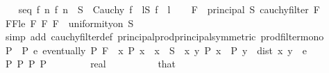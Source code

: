 \begin{isabellebody}
\ \ \isamarkupfalse%
\ seq{\isacharcolon}{\kern0pt}\ {\isachardoublequoteopen}{\isasymforall}f{\isachardot}{\kern0pt}\ {\isacharparenleft}{\kern0pt}{\isasymforall}n{\isachardot}{\kern0pt}\ f\ n\ {\isasymin}\ S{\isacharparenright}{\kern0pt}\ {\isasymand}\ Cauchy\ f\ {\isasymlongrightarrow}\ {\isacharparenleft}{\kern0pt}{\isasymexists}l{\isasymin}S{\isachardot}{\kern0pt}\ f\ {\isasymlonglonglongrightarrow}\ l{\isacharparenright}{\kern0pt}{\isachardoublequoteclose}\isanewline
\isanewline
\ \ \isamarkupfalse%
\ {\isacartoucheopen}F\ {\isasymle}\ principal\ S{\isacartoucheclose}\ {\isacartoucheopen}cauchy{\isacharunderscore}{\kern0pt}filter\ F{\isacartoucheclose}\isanewline
\ \ \isamarkupfalse%
\ FF{\isacharunderscore}{\kern0pt}le{\isacharcolon}{\kern0pt}\ {\isachardoublequoteopen}F\ {\isasymtimes}\isactrlsub F\ F\ {\isasymle}\ uniformity{\isacharunderscore}{\kern0pt}on\ S{\isachardoublequoteclose}\isanewline
\ \ \ \ \isamarkupfalse%
\ {\isacharparenleft}{\kern0pt}simp\ add{\isacharcolon}{\kern0pt}\ cauchy{\isacharunderscore}{\kern0pt}filter{\isacharunderscore}{\kern0pt}def\ principal{\isacharunderscore}{\kern0pt}prod{\isacharunderscore}{\kern0pt}principal{\isacharbrackleft}{\kern0pt}symmetric{\isacharbrackright}{\kern0pt}\ prod{\isacharunderscore}{\kern0pt}filter{\isacharunderscore}{\kern0pt}mono{\isacharparenright}{\kern0pt}\isanewline
\isanewline
\ \ \isamarkupfalse%
\ {\isacharquery}{\kern0pt}P\ {\isacharequal}{\kern0pt}\ {\isachardoublequoteopen}{\isasymlambda}P\ e{\isachardot}{\kern0pt}\ eventually\ P\ F\ {\isasymand}\ {\isacharparenleft}{\kern0pt}{\isasymforall}x{\isachardot}{\kern0pt}\ P\ x\ {\isasymlongrightarrow}\ x\ {\isasymin}\ S{\isacharparenright}{\kern0pt}\ {\isasymand}\ {\isacharparenleft}{\kern0pt}{\isasymforall}x\ y{\isachardot}{\kern0pt}\ P\ x\ {\isasymlongrightarrow}\ P\ y\ {\isasymlongrightarrow}\ dist\ x\ y\ {\isacharless}{\kern0pt}\ e{\isacharparenright}{\kern0pt}{\isachardoublequoteclose}\isanewline
\ \ \isamarkupfalse%
\ P{\isacharcolon}{\kern0pt}\ {\isachardoublequoteopen}{\isasymexists}P{\isachardot}{\kern0pt}\ {\isacharquery}{\kern0pt}P\ P\ {\isasymepsilon}{\isachardoublequoteclose}\ \ {\isachardoublequoteopen}{}\ {\isacharless}{\kern0pt}\ {\isasymepsilon}{\isachardoublequoteclose}\ \ {\isasymepsilon}\ {\isacharcolon}{\kern0pt}{\isacharcolon}{\kern0pt}\ real\isanewline
\ \ \isamarkupfalse%
\ {\isacharminus}{\kern0pt}\isanewline
\ \ \ \ \isamarkupfalse%
\ that\ \isamarkupfalse%

\end{isabellebody}
